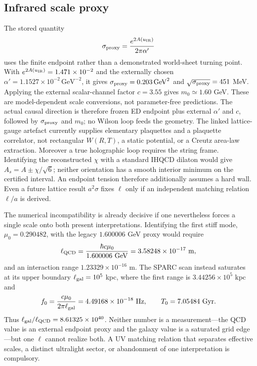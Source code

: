 \documentclass[10pt]{article}
\begin{document}
\subsection{Infrared scale proxy}

The stored quantity
\begin{equation}
 \sigma_{\rm proxy}=\frac{e^{2A(u_{\rm IR})}}{2\pi\alpha'}
\end{equation}
uses the finite endpoint rather than a demonstrated world-sheet turning point.
With $e^{2A(u_{\rm IR})}=1.471\times10^{-2}$ and the externally chosen
$\alpha'=1.1527\times10^{-2}\,\mathrm{GeV}^{-2}$, it gives
$\sigma_{\rm proxy}=0.203\,\mathrm{GeV}^2$ and
$\sqrt{\sigma_{\rm proxy}}=451$ MeV.  Applying the external scalar-channel
factor $c=3.55$ gives $m_0\simeq1.60$ GeV.  These are model-dependent scale
conversions, not parameter-free predictions.
The actual causal direction is therefore frozen ED endpoint plus external
$\alpha'$ and $c$, followed by $\sigma_{\rm proxy}$ and $m_0$; no Wilson loop
feeds the geometry.  The linked lattice-gauge artefact currently supplies
elementary plaquettes and a plaquette correlator, not rectangular $W(R,T)$, a
static potential, or a Creutz area-law extraction.  Moreover a true holographic loop requires the string
frame.  Identifying the reconstructed $\chi$ with a standard IHQCD dilaton
would give $A_s=A\pm\chi/\sqrt6$; neither orientation has a smooth interior
minimum on the certified interval.  An endpoint tension therefore additionally
assumes a hard wall.  Even a future lattice result $a^2\sigma$ fixes $\ell$
only if an independent matching relation $\ell/a$ is derived.

The numerical incompatibility is already decisive if one nevertheless forces
a single scale onto both present interpretations.  Identifying the first stiff
mode, $\mu_0=0.290482$, with the legacy $1.600006$ GeV proxy would require
\begin{equation}
 \ell_{\rm QCD}=\frac{\hbar c\mu_0}{1.600006\ {\rm GeV}}
 =3.58248\times10^{-17}\ {\rm m},
\end{equation}
and an interaction range $1.23329\times10^{-16}$ m.  The SPARC scan instead
saturates at its upper boundary $\ell_{\rm gal}=10^5$ kpc, where the first
range is $3.44256\times10^5$ kpc and
\begin{equation}
 f_0=\frac{c\mu_0}{2\pi\ell_{\rm gal}}
 =4.49168\times10^{-18}\ {\rm Hz},\qquad T_0=7.05484\ {\rm Gyr}.
 \label{eq:scaleconsistency}
\end{equation}
Thus $\ell_{\rm gal}/\ell_{\rm QCD}=8.61325\times10^{40}$.  Neither number is
a measurement---the QCD value is an external endpoint proxy and the galaxy
value is a saturated grid edge---but one $\ell$ cannot realize both.  A UV
matching relation that separates effective scales, a distinct ultralight
sector, or abandonment of one interpretation is compulsory.
\end{document}
